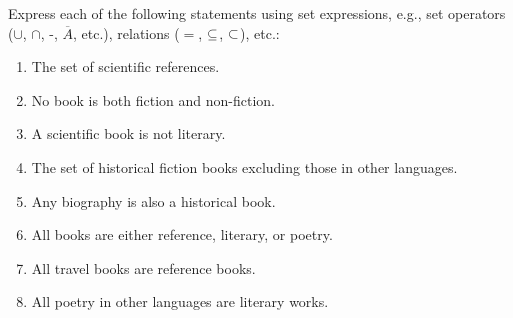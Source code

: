 \begin{questions}
Express each of the following statements using set expressions, e.g., set operators ($\cup$, $\cap$, -, $\overline{A}$, etc.), relations ($=$, $\subseteq$, $\subset$), etc.: 

\begin{enumerate}[label=(\alph*),itemsep=1pt,parsep=0pt,
        topsep=0pt,partopsep=0pt]
    \item \ifprintanswers {} \tab \fi The set of scientific references. 
    \item \ifprintanswers {} \tab \fi No book is both fiction and non-fiction. 
    \item \ifprintanswers {} \tab \fi A scientific book is not literary.
    \item \ifprintanswers {} \tab \fi The set of historical fiction books excluding those in other languages. 
    \item \ifprintanswers {} \tab \fi  Any biography is also a historical book.
    \item \ifprintanswers  {} \tab \fi All books are either reference, literary, or poetry. 
    \item \ifprintanswers {}  \tab \fi All travel books are reference books.
    \item \ifprintanswers {} \tab \fi All poetry in other languages are literary works.
\end{enumerate}

\end{questions}
